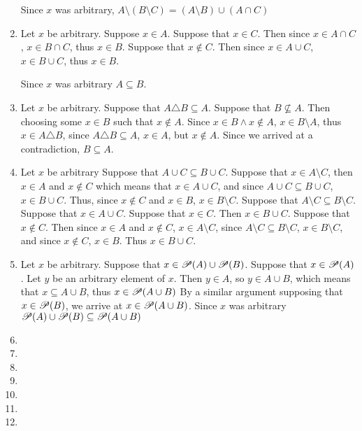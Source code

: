 \begin{enumerate}
    Since $x$ was arbitrary, $A \setminus (B \setminus C) = (A \setminus B) \cup (A \cap C)$
    \item
    Let $x$ be arbitrary.
    Suppose $x \in A$.
     Suppose that $x \in C$. Then since $x \in A \cap C$, $x \in B \cap C$, thus $x \in B$.
     Suppose that $x \notin C$. Then since $x \in A \cup C$, $x \in B \cup C$, thus $x \in B$.

    Since $x$ was arbitrary $A \subseteq B$.
    \item
    Let $x$ be arbitrary. Suppose that $A \triangle B \subseteq A$. Suppose that $B \not \subseteq A$. Then choosing some $x \in B$ such that $x \notin A$. Since $x \in B \land x \notin A$, $x \in B \setminus A$, thus $x \in A \triangle B$, since $A \triangle B \subseteq A$, $x \in A$, but $x \notin A$. Since we arrived at a contradiction, $B \subseteq A$.
    \item
    Let $x$ be arbitrary
    \rdir Suppose that $A \cup C \subseteq B \cup C$. Suppose that $x \in A \setminus C$, then $x \in A$ and $x \notin C$ which means that $x \in A \cup C$, and since $A \cup C \subseteq B \cup C$, $x \in B \cup C$. Thus, since $x \notin C$ and $x \in B$, $x \in B \setminus C$.
    \ldir Suppose that $A \setminus C \subseteq B \setminus C$. Suppose that $x \in A \cup C$.
     Suppose that $x \in C$. Then $x \in B \cup C$.
     Suppose that $x \notin C$. Then since $x \in A$ and $x \notin C$, $x \in A \setminus C$, since $A \setminus C \subseteq B \setminus C$, $x \in B \setminus C$, and since $x \notin C$, $x \in B$. Thus $x \in B \cup C$.
    \item
    Let $x$ be arbitrary. Suppose that $x \in \mathscr{P}(A) \cup \mathscr{P}(B)$.
     Suppose that $x \in \mathscr{P}(A)$. Let $y$ be an arbitrary element of $x$. Then $y \in A$, so $y \in A \cup B$, which means that $x \subseteq A \cup B$, thus $x \in \mathscr{P}(A \cup B)$
     By a similar argument supposing that $x \in \mathscr{P}(B)$, we arrive at $x \in \mathscr{P}(A \cup B)$.
    Since $x$ was arbitrary $\mathscr{P}(A) \cup \mathscr{P}(B) \subseteq \mathscr{P}(A \cup B)$ 
    \item
    \item
    \item
    \item
    \item
    \item
    \item

\end{enumerate}
